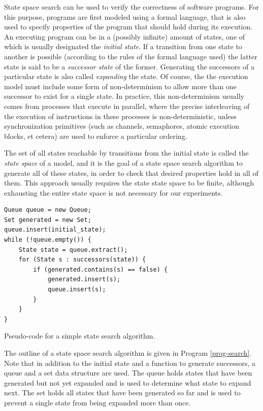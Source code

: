 \documentclass{acm_proc_article-sp}
\begin{document}
State space search can be used to verify the correctness of software programs.
For this purpose, programs are first modeled using a formal language, that is
also used to specify properties of the program that should hold during its
execution. An executing program can be in a (possibly infinite) amount of states,
one of which is usually designated the \emph{initial state}. If a transition
from one state to another is possible (according to the rules of the formal
language used) the latter state is said to be a \emph{successor state} of the
former.
Generating the successors of a particular state is also called
\emph{expanding} the state. Of course, the the execution model
must include some form of non-determinism to allow more than one successor to
exist for a single state.
In practice, this non-determinism usually comes from processes that execute in
parallel, where the precise interleaving of the execution of
instructions in these processes is non-deterministic, unless synchronization
primitives (such as channels, semaphores, atomic execution blocks, et cetera)
are used to enforce a particular ordering.

The set of all states reachable by transitions from the initial state is called
the \emph{state space} of a model, and it is the goal of a state space search
algorithm to generate all of these states, in order to check that desired
properties hold in all of them. This approach usually requires the state state
space to be finite, although exhausting the entire state space is not necessary
for our experiments.

\begin{program}[t]
\begin{verbatim}
Queue queue = new Queue;
Set generated = new Set;
queue.insert(initial_state);
while (!queue.empty()) {
    State state = queue.extract();
    for (State s : successors(state)) {
        if (generated.contains(s) == false) {
            generated.insert(s);
            queue.insert(s);
        }
    }
}
\end{verbatim}
\caption{Pseudo-code for a simple state search algorithm.}
\label{prog-search}
\end{program}

The outline of a state space search algorithm is given in Program
\ref{prog-search}. Note that in addition to the initial state and a function
to generate successors, a queue and a set data structure are used. The queue
holds states that have been generated but not yet expanded and is used to
determine what state to expand next. The set holds all states that have been
generated so far and is used to prevent a single state from being expanded
more than once.
\end{document}
